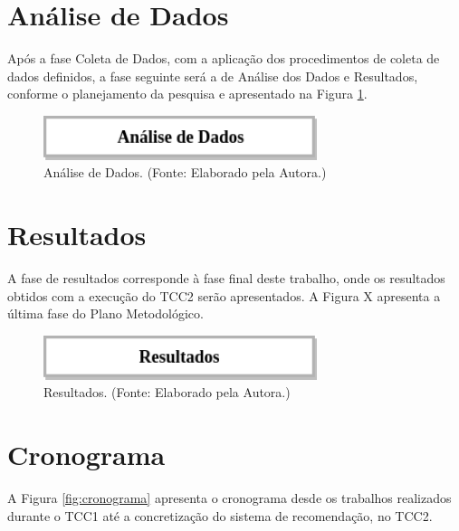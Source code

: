 \section{Análise de Dados}

Após a fase Coleta de Dados, com a aplicação dos procedimentos de coleta de dados definidos, a fase seguinte será a de Análise dos Dados e Resultados, conforme o planejamento da pesquisa e apresentado na Figura \ref{fig:analiseDados}.

        \begin{figure}[H]
          \centering
          \includegraphics[width=8cm]{figuras/analiseDados.png}
          \caption{Análise de Dados. (Fonte: Elaborado pela Autora.)}
          \label{fig:analiseDados}

        \end{figure}

\section{Resultados}

A fase de resultados corresponde à fase final deste trabalho, onde os resultados obtidos com a execução do TCC2 serão apresentados. A Figura X apresenta a última fase do Plano Metodológico.

        \begin{figure}[H]
          \centering
          \includegraphics[width=8cm]{figuras/resultados.png}
          \caption{Resultados. (Fonte: Elaborado pela Autora.)}
          \label{fig:resultados}

        \end{figure}


\section{Cronograma}

A Figura \ref{fig:cronograma} apresenta o cronograma desde os trabalhos realizados durante o TCC1 até a concretização do sistema de recomendação, no TCC2.

